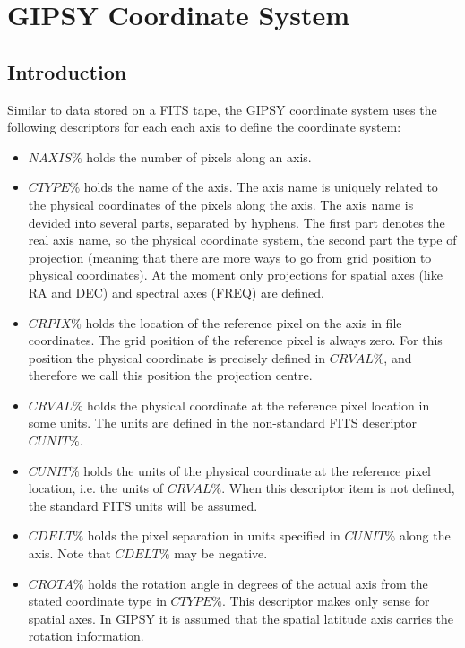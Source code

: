 \chapter{GIPSY Coordinate System}

\section{Introduction}

Similar to data stored on a FITS tape, the GIPSY coordinate system uses
the following descriptors for each each axis to define the coordinate
system:

\begin{itemize}

\item $NAXIS\%$ holds the number of pixels along an axis.

\item $CTYPE\%$ holds the name of the axis.  The axis name
is uniquely related to the physical coordinates of the pixels along the
axis.  The axis name is devided into several parts, separated by
hyphens.  The first part denotes the real axis name, so the physical
coordinate system, the second part the type of projection (meaning that
there are more ways to go from grid position to physical coordinates).
At the moment only projections for spatial axes (like RA and DEC) and
spectral axes (FREQ) are defined.

\item $CRPIX\%$ holds the location of the reference pixel
on the axis in file coordinates.  The grid position of the reference
pixel is always zero.  For this position the physical coordinate is
precisely defined in $CRVAL\%$, and therefore we call this position the
projection centre.

\item $CRVAL\%$ holds the physical coordinate at the
reference pixel location in some units.  The units are defined in the
non-standard FITS descriptor $CUNIT\%$.

\item $CUNIT\%$ holds the units of the physical
coordinate at the reference pixel location, i.e.  the units of $CRVAL\%$.
When this descriptor item is not defined, the standard FITS units will
be assumed.

\item $CDELT\%$ holds the pixel separation in units
specified in $CUNIT\%$ along the axis.  Note that $CDELT\%$ may be
negative.

\item $CROTA\%$ holds the rotation angle in degrees of the
actual axis from the stated coordinate type in $CTYPE\%$.  This
descriptor makes only sense for spatial axes.  In GIPSY it is assumed
that the spatial latitude axis carries the rotation information.

\end{itemize}


